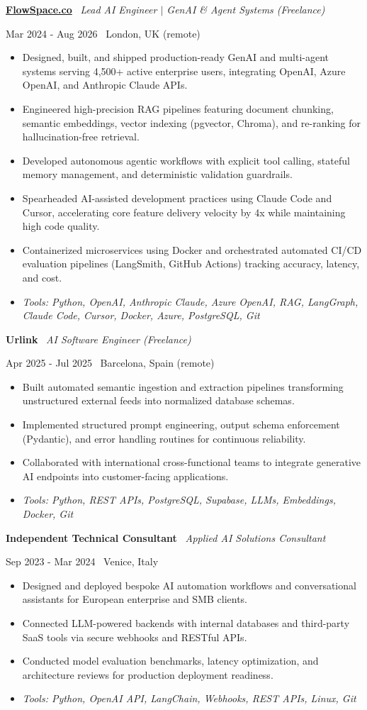 \documentclass[a4paper,10pt]{article}
\newcommand{\role}[4]{%
  \vspace{2pt}\noindent
  \begin{minipage}[t]{0.70\textwidth}\raggedright\textbf{#1} \textbullet\ \textit{#3}\end{minipage}%
  \hfill
  \begin{minipage}[t]{0.28\textwidth}\raggedleft\footnotesize\color{gray}#2 \textbullet\ #4\end{minipage}%
  \vspace{1pt}%
}
\begin{document}
\role{\href{https://flowspace.co}{FlowSpace.co}}{Mar 2024 - Aug 2026}{Lead AI Engineer $\vert$ GenAI \& Agent Systems (Freelance)}{London, UK (remote)}
\begin{itemize}
  \item Designed, built, and shipped production-ready GenAI and multi-agent systems serving 4,500+ active enterprise users, integrating OpenAI, Azure OpenAI, and Anthropic Claude APIs.
  \item Engineered high-precision RAG pipelines featuring document chunking, semantic embeddings, vector indexing (pgvector, Chroma), and re-ranking for hallucination-free retrieval.
  \item Developed autonomous agentic workflows with explicit tool calling, stateful memory management, and deterministic validation guardrails.
  \item Spearheaded AI-assisted development practices using Claude Code and Cursor, accelerating core feature delivery velocity by 4x while maintaining high code quality.
  \item Containerized microservices using Docker and orchestrated automated CI/CD evaluation pipelines (LangSmith, GitHub Actions) tracking accuracy, latency, and cost.
  \item \textit{Tools: Python, OpenAI, Anthropic Claude, Azure OpenAI, RAG, LangGraph, Claude Code, Cursor, Docker, Azure, PostgreSQL, Git}
\end{itemize}

\role{Urlink}{Apr 2025 - Jul 2025}{AI Software Engineer (Freelance)}{Barcelona, Spain (remote)}
\begin{itemize}
  \item Built automated semantic ingestion and extraction pipelines transforming unstructured external feeds into normalized database schemas.
  \item Implemented structured prompt engineering, output schema enforcement (Pydantic), and error handling routines for continuous reliability.
  \item Collaborated with international cross-functional teams to integrate generative AI endpoints into customer-facing applications.
  \item \textit{Tools: Python, REST APIs, PostgreSQL, Supabase, LLMs, Embeddings, Docker, Git}
\end{itemize}

\role{Independent Technical Consultant}{Sep 2023 - Mar 2024}{Applied AI Solutions Consultant}{Venice, Italy}
\begin{itemize}
  \item Designed and deployed bespoke AI automation workflows and conversational assistants for European enterprise and SMB clients.
  \item Connected LLM-powered backends with internal databases and third-party SaaS tools via secure webhooks and RESTful APIs.
  \item Conducted model evaluation benchmarks, latency optimization, and architecture reviews for production deployment readiness.
  \item \textit{Tools: Python, OpenAI API, LangChain, Webhooks, REST APIs, Linux, Git}
\end{itemize}
\end{document}
